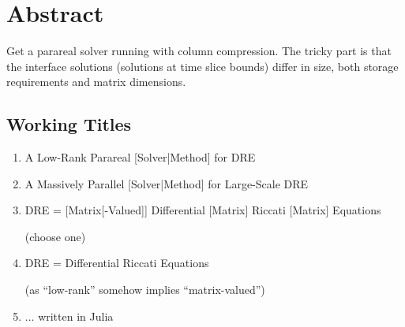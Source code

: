\chapter{Abstract}

Get a parareal solver running with column compression.
The tricky part is that the interface solutions (solutions at time slice bounds) differ in size,
\wrt both storage requirements and matrix dimensions.

\section*{Working Titles}
\begin{enumerate}
  \item A Low-Rank Parareal [Solver|Method] for DRE
  \item A Massively Parallel [Solver|Method] for Large-Scale DRE
  \item DRE = [Matrix[-Valued]] Differential [Matrix] Riccati [Matrix] Equations

    (choose one)
  \item DRE = Differential Riccati Equations

    (as \enquote{low-rank} somehow implies \enquote{matrix-valued})
  \item ... written in Julia
\end{enumerate}
